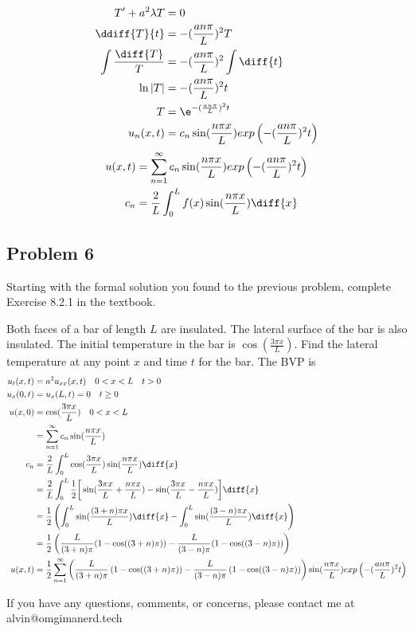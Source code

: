 \documentclass{math}
\begin{document}
\begin{align*}
  T'+a^2\lambda T &= 0 \\
  \ddiff{T}{t} &= -(\frac{an\pi}{L})^2T \\
  \int\frac{\diff{T}}{T} &= -(\frac{an\pi}{L})^2\int\diff{t} \\
  \ln|T| &= -(\frac{an\pi}{L})^2t \\
  T &= \e^{-(\frac{an\pi}{L})^2t} \\
  u_n(x,t) &= c_n\sin(\frac{n\pi x}{L})
    exp\left(-(\frac{an\pi}{L})^2t\right)
\end{align*}
\begin{align*}
  u(x,t) &= \sum_{n=1}^{\infty}c_n\sin(\frac{n\pi x}{L})
    exp\left(-(\frac{an\pi}{L})^2t\right) \\
  c_n &= \frac{2}{L}\int_{0}^{L}f(x)\sin(\frac{n\pi x}{L})\diff{x}
\end{align*}

\subsection*{Problem 6}
Starting with the formal solution you found to the previous problem, complete
Exercise 8.2.1 in the textbook. \par
Both faces of a bar of length \( L \) are insulated. The lateral surface of the
bar is also insulated. The initial temperature in the bar is
\( \cos(\frac{3\pi x}{L}) \). Find the lateral temperature at any point \( x \)
and time \( t \) for the bar. The BVP is
\begin{align*}
  u_t(x,t) &= a^2u_{xx}(x,t) \quad 0<x<L \quad t > 0 \\
  u_x(0,t) &= u_x(L,t) = 0 \quad t\ge 0 \\
  u(x,0) &= \cos(\frac{3\pi x}{L}) \quad 0<x<L \\
  &= \sum_{n=1}^{\infty}c_n\sin(\frac{n\pi x}{L}) \\
  c_n &= \frac{2}{L}\int_{0}^{L}\cos(\frac{3\pi x}{L})
    \sin(\frac{n\pi x}{L})\diff{x} \\
  &= \frac{2}{L}\int_{0}^{L}\frac{1}{2}\bigg[
    \sin(\frac{3\pi x}{L}+\frac{n\pi x}{L})-
    \sin(\frac{3\pi x}{L}-\frac{n\pi x}{L})\bigg]\diff{x} \\
  &= \frac{1}{2}\left(\int_{0}^{L}\sin(\frac{(3+n)\pi x}{L})\diff{x}-
    \int_{0}^{L}\sin(\frac{(3-n)\pi x}{L})\diff{x}\right) \\
  &= \frac{1}{2}\left(\frac{L}{(3+n)\pi}(1-\cos((3+n)\pi))-
    \frac{L}{(3-n)\pi}(1-\cos((3-n)\pi))\right) \\
  u(x,t) &= \frac{1}{2}\sum_{n=1}^{\infty}
    \left(\frac{L}{(3+n)\pi}\left(1-\cos((3+n)\pi)\right)-
    \frac{L}{(3-n)\pi}\left(1-\cos((3-n)\pi)\right)\right)
    \sin(\frac{n\pi x}{L})exp\left(-(\frac{an\pi}{L})^2t\right) \\
\end{align*}

\begin{center}
  If you have any questions, comments, or concerns, please contact me at
  alvin@omgimanerd.tech
\end{center}
\end{document}
